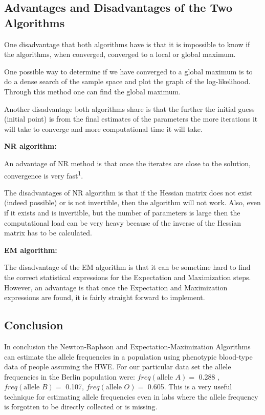 \documentclass[]{article}
\begin{document}
\subsection{Advantages and Disadvantages of the Two
Algorithms}\label{advantages-and-disadvantages-of-the-two-algorithms}

One disadvantage that both algorithms have is that it is impossible to
know if the algorithms, when converged, converged to a local or global
maximum.

One possible way to determine if we have converged to a global maximum
is to do a dense search of the sample space and plot the graph of the
log-likelihood. Through this method one can find the global maximum.

Another disadvantage both algorithms share is that the further the
initial guess (initial point) is from the final estimates of the
parameters the more iterations it will take to converge and more
computational time it will take.

\textbf{NR algorithm:}

An advantage of NR method is that once the iterates are close to the
solution, convergence is very fast\textsuperscript{1}.

The disadvantages of NR algorithm is that if the Hessian matrix does not
exist (indeed possible) or is not invertible, then the algorithm will
not work. Also, even if it exists and is invertible, but the number of
parameters is large then the computational load can be very heavy
because of the inverse of the Hessian matrix has to be calculated.

\textbf{EM algorithm:}

The disadvantage of the EM algorithm is that it can be sometime hard to
find the correct statistical expressions for the Expectation and
Maximization steps. However, an advantage is that once the Expectation
and Maximization expressions are found, it is fairly straight forward to
implement.

\subsection{Conclusion}\label{conclusion}

In conclusion the Newton-Raphson and Expectation-Maximization Algorithms
can estimate the allele frequencies in a population using phenotypic
blood-type data of people assuming the HWE. For our particular data set
the allele frequencies in the Berlin population were:
\(freq(\mbox{allele } A)=\) 0.288 , \(freq(\mbox{allele } B) =\) 0.107,
\(freq(\mbox{allele } O) =\) 0.605. This is a very useful technique for
estimating allele frequencies even in labs where the allele frequency is
forgotten to be directly collected or is missing.
\end{document}
